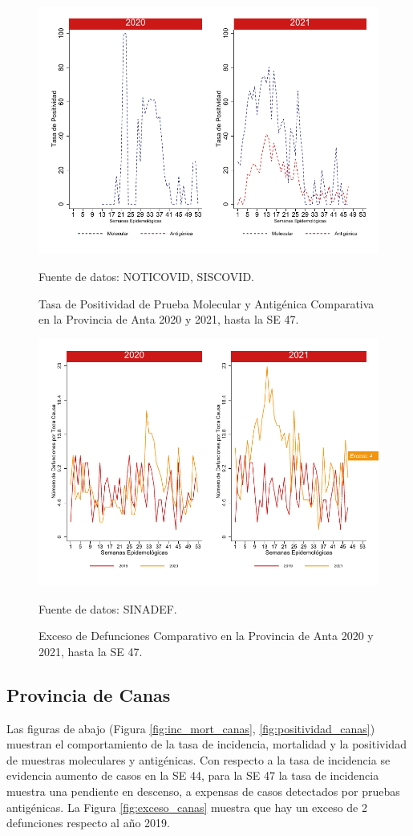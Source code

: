 \documentclass[12pt,a4paper,openany]{book}
\begin{document}
		\begin{figure}[h]
			\caption{Tasa de Positividad de Prueba Molecular y Antigénica Comparativa en la Provincia de Anta 2020 y 2021, hasta la SE 47.}\label{fig:positividad_anta}
			\begin{center}
				\includegraphics[width=0.7\linewidth]{../figuras/positividad_20_21_2}
			\end{center}
			{\footnotesize {Fuente de datos: NOTICOVID, SISCOVID.}}
		\end{figure}
		
		\begin{figure}[h]
			\caption{Exceso de Defunciones Comparativo en la Provincia de Anta  2020 y 2021, hasta la SE 47.}\label{fig:exceso_anta}
			\begin{center}
				\includegraphics[width=0.7\linewidth]{../figuras/exceso_2}
			\end{center}
			{\footnotesize {Fuente de datos: SINADEF.}}
		\end{figure}
		
		\clearpage
		
		\subsection*{Provincia de Canas}
		\noindent Las figuras de abajo (Figura \ref{fig:inc_mort_canas}, \ref{fig:positividad_canas}) muestran el comportamiento de la tasa de incidencia, mortalidad y la positividad de muestras moleculares y antigénicas. Con respecto a la tasa de incidencia se evidencia aumento de casos en la SE 44, para la SE 47 la tasa de incidencia muestra una pendiente en descenso, a expensas de casos detectados por pruebas antigénicas. La Figura \ref{fig:exceso_canas} muestra que hay un exceso de 2 defunciones respecto al año 2019.
		
\end{document}

